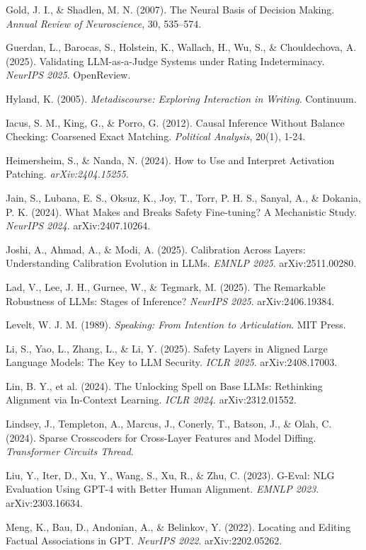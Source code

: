 \documentclass[11pt]{article}
\begin{document}
Gold, J. I., \& Shadlen, M. N. (2007). The Neural Basis of Decision Making. \emph{Annual Review of Neuroscience}, 30, 535--574.

Guerdan, L., Barocas, S., Holstein, K., Wallach, H., Wu, S., \& Chouldechova, A. (2025). Validating LLM-as-a-Judge Systems under Rating Indeterminacy. \emph{NeurIPS 2025}. OpenReview.

Hyland, K. (2005). \emph{Metadiscourse: Exploring Interaction in Writing}. Continuum.

Iacus, S. M., King, G., \& Porro, G. (2012). Causal Inference Without Balance Checking: Coarsened Exact Matching. \emph{Political Analysis}, 20(1), 1-24.

Heimersheim, S., \& Nanda, N. (2024). How to Use and Interpret Activation Patching. \emph{arXiv:2404.15255}.

Jain, S., Lubana, E. S., Oksuz, K., Joy, T., Torr, P. H. S., Sanyal, A., \& Dokania, P. K. (2024). What Makes and Breaks Safety Fine-tuning? A Mechanistic Study. \emph{NeurIPS 2024}. arXiv:2407.10264.

Joshi, A., Ahmad, A., \& Modi, A. (2025). Calibration Across Layers: Understanding Calibration Evolution in LLMs. \emph{EMNLP 2025}. arXiv:2511.00280.

Lad, V., Lee, J. H., Gurnee, W., \& Tegmark, M. (2025). The Remarkable Robustness of LLMs: Stages of Inference? \emph{NeurIPS 2025}. arXiv:2406.19384.

Levelt, W. J. M. (1989). \emph{Speaking: From Intention to Articulation}. MIT Press.

Li, S., Yao, L., Zhang, L., \& Li, Y. (2025). Safety Layers in Aligned Large Language Models: The Key to LLM Security. \emph{ICLR 2025}. arXiv:2408.17003.

Lin, B. Y., et al. (2024). The Unlocking Spell on Base LLMs: Rethinking Alignment via In-Context Learning. \emph{ICLR 2024}. arXiv:2312.01552.

Lindsey, J., Templeton, A., Marcus, J., Conerly, T., Batson, J., \& Olah, C. (2024). Sparse Crosscoders for Cross-Layer Features and Model Diffing. \emph{Transformer Circuits Thread}.

Liu, Y., Iter, D., Xu, Y., Wang, S., Xu, R., \& Zhu, C. (2023). G-Eval: NLG Evaluation Using GPT-4 with Better Human Alignment. \emph{EMNLP 2023}. arXiv:2303.16634.

Meng, K., Bau, D., Andonian, A., \& Belinkov, Y. (2022). Locating and Editing Factual Associations in GPT. \emph{NeurIPS 2022}. arXiv:2202.05262.
\end{document}
